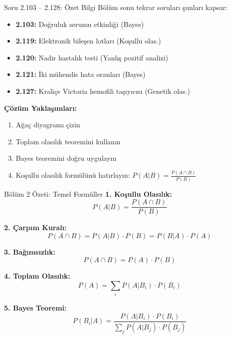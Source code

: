 \documentclass[light]{lutbeamer}
\begin{document}
\begin{frame}{Soru 2.103 -- 2.128: Özet Bilgi}
    \small
    Bölüm sonu tekrar soruları şunları kapsar:
    
    \begin{itemize}
        \item \textbf{2.103:} Doğruluk serumu etkinliği (Bayes)
        \item \textbf{2.119:} Elektronik bileşen lotları (Koşullu olas.)
        \item \textbf{2.120:} Nadir hastalık testi (Yanlış pozitif analizi)
        \item \textbf{2.121:} İki mühendis hata oranları (Bayes)
        \item \textbf{2.127:} Kraliçe Victoria hemofili taşıyıcısı (Genetik olas.)
    \end{itemize}
    
    \vspace{0.3cm}
    \textbf{Çözüm Yaklaşımları:}
    \begin{enumerate}
        \item Ağaç diyagramı çizin
        \item Toplam olasılık teoremini kullanın
        \item Bayes teoremini doğru uygulayın
        \item Koşullu olasılık formülünü hatırlayın: $P(A|B) = \frac{P(A \cap B)}{P(B)}$
    \end{enumerate}
\end{frame}

\begin{frame}{Bölüm 2 Özeti: Temel Formüller}
    \color{blue}
    \textbf{1. Koşullu Olasılık:}
    \[ P(A|B) = \frac{P(A \cap B)}{P(B)} \]
    
    \textbf{2. Çarpım Kuralı:}
    \[ P(A \cap B) = P(A|B) \cdot P(B) = P(B|A) \cdot P(A) \]
    
    \textbf{3. Bağımsızlık:}
    \[ P(A \cap B) = P(A) \cdot P(B) \]
    
    \textbf{4. Toplam Olasılık:}
    \[ P(A) = \sum_i P(A|B_i) \cdot P(B_i) \]
    
    \textbf{5. Bayes Teoremi:}
    \[ P(B_i|A) = \frac{P(A|B_i) \cdot P(B_i)}{\sum_j P(A|B_j) \cdot P(B_j)} \]
\end{frame}
\end{document}
